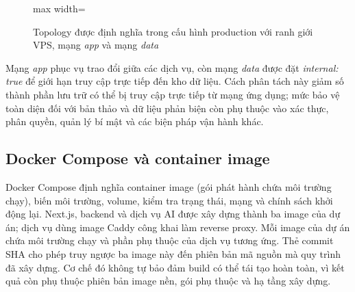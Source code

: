 \begin{figure}[H]
\begin{adjustbox}{max width=\textwidth}
  \end{adjustbox}
  \caption{Topology được định nghĩa trong cấu hình production với ranh giới VPS, mạng \textit{app} và mạng \textit{data}}
  \label{fig:ch3-production-cut}
\end{figure}

Mạng \textit{app} phục vụ trao đổi giữa các dịch vụ, còn mạng \textit{data} được đặt \textit{internal: true} để giới hạn truy cập trực tiếp đến kho dữ liệu. Cách phân tách này giảm số thành phần lưu trữ có thể bị truy cập trực tiếp từ mạng ứng dụng; mức bảo vệ toàn diện đối với bản thảo và dữ liệu phản biện còn phụ thuộc vào xác thực, phân quyền, quản lý bí mật và các biện pháp vận hành khác.

\subsection{Docker Compose và container image}

Docker Compose định nghĩa container image (gói phát hành chứa môi trường chạy), biến môi trường, volume, kiểm tra trạng thái, mạng và chính sách khởi động lại. Next.js, backend và dịch vụ AI được xây dựng thành ba image của dự án; dịch vụ  dùng image Caddy công khai làm reverse proxy. Mỗi image của dự án chứa môi trường chạy và phần phụ thuộc của dịch vụ tương ứng. Thẻ commit SHA cho phép truy ngược ba image này đến phiên bản mã nguồn mà quy trình đã xây dựng. Cơ chế đó không tự bảo đảm build có thể tái tạo hoàn toàn, vì kết quả còn phụ thuộc phiên bản image nền, gói phụ thuộc và hạ tầng xây dựng.

